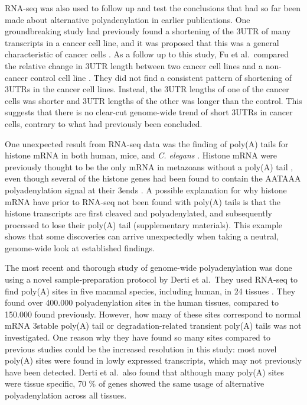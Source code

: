 RNA-seq was also used to follow up and test the conclusions that had so far
been made about alternative polyadenylation in earlier publications. One
groundbreaking study had previously found a shortening of the 3\ppp UTR of many
transcripts in a cancer cell line, and it was proposed that this was a general
characteristic of cancer cells \cite{mayr_widespread_2009}. As a follow up to
this study, Fu et al.\ compared the relative change in 3\ppp UTR length between
two cancer cell lines and a non-cancer control cell line
\cite{fu_differential_2011}. They did not find a consistent pattern of
shortening of 3\ppp UTRs in the cancer cell lines.  Instead, the 3\ppp UTR
lengths of one of the cancer cells was shorter and 3\ppp UTR lengths of the
other was longer than the control. This suggests that there is no clear-cut
genome-wide trend of short 3\ppp UTRs in cancer cells, contrary to what had
previously been concluded.

One unexpected result from RNA-seq data was the finding of poly(A) tails for
histone mRNA in both human, mice, and \textit{C. elegans}
\cite{mangone_landscape_2010, shepard_complex_2011}.  Histone mRNA were
previously thought to be the only mRNA in metazoans without a poly(A) tail
\cite{marzluff_metabolism_2008}, even though several of the histone genes had
been found to contain the AATAAA polyadenylation signal at their 3\ppp ends
\cite{keall_histone_2007}. A possible explanation for why histone mRNA have
prior to RNA-seq not been found with poly(A) tails is that the histone
transcripts are first cleaved and polyadenylated, and subsequently processed to
lose their poly(A) tail \cite{mangone_landscape_2010} (supplementary
materials). This example shows that some discoveries can arrive unexpectedly
when taking a neutral, genome-wide look at established findings.

The most recent and thorough study of genome-wide polyadenylation was done
using a novel sample-preparation protocol by Derti et al.\ They used RNA-seq to
find poly(A) sites in five mammal species, including human, in 24 tissues
\cite{derti_quantitative_2012}. They found over 400.000 polyadenylation sites
in the human tissues, compared to 150.000 found previously. However, how many
of these sites correspond to normal mRNA 3\ppp stable poly(A) tail or
degradation-related transient poly(A) tails was not investigated. One reason
why they have found so many sites compared to previous studies could be the
increased resolution in this study: most novel poly(A) sites were found in
lowly expressed transcripts, which may not previously have been detected.
Derti et al.\ also found that although many poly(A) sites were tissue specific,
70 \% of genes showed the same usage of alternative polyadenylation across all
tissues.
